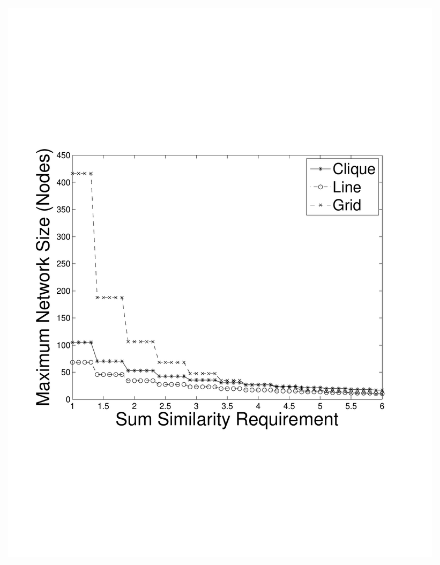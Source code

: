 \begin{figure}
{	\includegraphics[scale=0.23, clip=true, trim=14mm 65mm 20mm 65mm]{figures/use_cases_examples/num_nodes_vs_sum_sim_10_T_12_IS.pdf}
        \label{fig:use_case_num_nodes_vs_qoi}
        }
  \subfigure[Max Network Size vs. T (SS = 5.0)]{
}
\end{figure}

